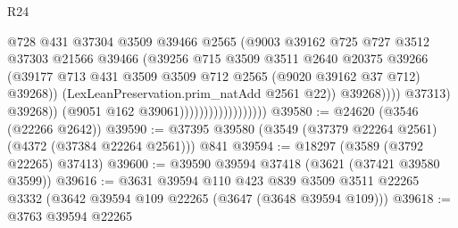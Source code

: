 \begin{lexlean}{R24}
\begin{coremodule}
                                                    @728
                                                    @431
                                                    @37304
                                                    @3509
                                                    @39466
                                                    @2565
                                                    (@9003
                                                      @39162
                                                      @725
                                                      @727
                                                      @3512
                                                      @37303
                                                      @21566
                                                      @39466
                                                      (@39256
                                                        @715
                                                        @3509
                                                        @3511
                                                        @2640
                                                        @20375
                                                        @39266
                                                        (@39177
                                                          @713
                                                          @431
                                                          @3509
                                                          @3509
                                                          @712
                                                          @2565
                                                          (@9020 @39162 @37 @712)
                                                          @39268))
                                                      (LexLeanPreservation.prim_natAdd @2561 @22))
                                                    @39268))))
                                            @37313)
                                          @39268))
                                      (@9051 @162 @39061))))))))))))))))))
@39580 := @24620 (@3546 (@22266 @2642))
@39590 := @37395 @39580 (@3549 (@37379 @22264 @2561) (@4372 (@37384 @22264 @2561))) @841
@39594 := @18297 (@3589 (@3792 @22265) @37413)
@39600 := @39590 @39594 @37418 (@3621 (@37421 @39580 @3599))
@39616 := @3631
    @39594
    @110
    @423
    @839
    @3509
    @3511
    @22265
    @3332
    (@3642 @39594 @109 @22265 (@3647 (@3648 @39594 @109)))
@39618 := @3763 @39594 @22265

\end{coremodule}
\end{lexlean}
